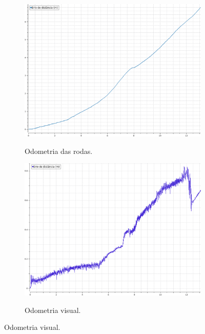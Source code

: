 \documentclass[repeatfields,xlists,xpacks,oneside,yearsonly]{ufrgscca}
\begin{document}
\begin{figure}[h]
    \caption{Erro dos sistemas de odometria}
    \label{fig:odom_error}
    \begin{subfigure}{0.5\linewidth}
        {
            \centering
            \caption{Odometria das rodas.}
            \label{fig:odom_controller_error}
            \includegraphics[width=0.98\linewidth]{odom-controlador-error.png}\\
        }
    \end{subfigure}
    \begin{subfigure}{0.5\linewidth}
        {
            \centering
            \caption{Odometria visual.}
            \label{fig:odom_visual_error}
            \includegraphics[width=0.98\linewidth]{odom-visual-error.png}\\
        }
    \end{subfigure}
\end{figure}
\end{document}
